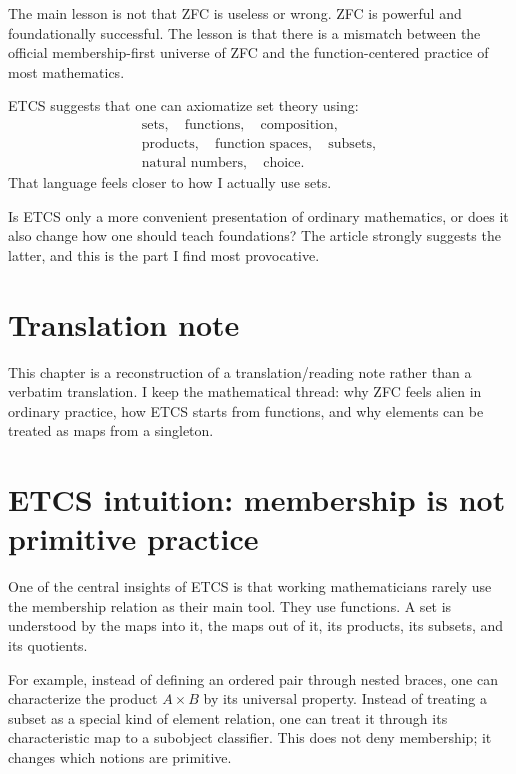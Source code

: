 The main lesson is not that ZFC is useless or wrong.  ZFC is powerful and foundationally successful.  The lesson is that there is a mismatch between the official membership-first universe of ZFC and the function-centered practice of most mathematics.

ETCS suggests that one can axiomatize set theory using:
\[
\begin{gathered}
  \text{sets},\quad \text{functions},\quad \text{composition},\\
  \text{products},\quad \text{function spaces},\quad \text{subsets},\\
  \text{natural numbers},\quad \text{choice}.
\end{gathered}
\]
That language feels closer to how I actually use sets.

\begin{question}
Is ETCS only a more convenient presentation of ordinary mathematics, or does it also change how one should teach foundations?  The article strongly suggests the latter, and this is the part I find most provocative.
\end{question}

\section{Translation note}

This chapter is a reconstruction of a translation/reading note rather than a verbatim translation.  I keep the mathematical thread: why ZFC feels alien in ordinary practice, how ETCS starts from functions, and why elements can be treated as maps from a singleton.


\section{ETCS intuition: membership is not primitive practice}

One of the central insights of ETCS is that working mathematicians rarely use the membership relation as their main tool.  They use functions.  A set is understood by the maps into it, the maps out of it, its products, its subsets, and its quotients.

For example, instead of defining an ordered pair through nested braces, one can characterize the product \(A\times B\) by its universal property.  Instead of treating a subset as a special kind of element relation, one can treat it through its characteristic map to a subobject classifier.  This does not deny membership; it changes which notions are primitive.

